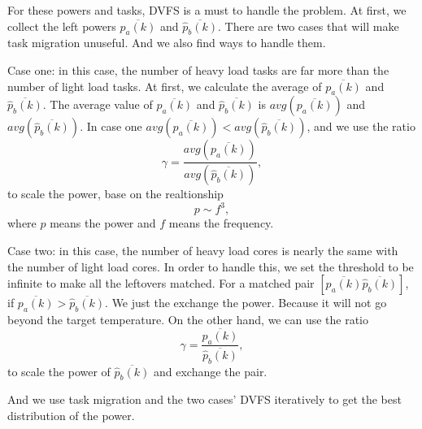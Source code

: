 For these powers and tasks, DVFS is a must to handle the problem.
At first, we collect the left powers $\overline{p_a(k)}$ and $\overline{\hat{p}_{b}(k)}$. There are two cases that will make task migration unuseful. And we also find ways to handle them.


Case one:
 in this case, the number of heavy load tasks are far more than the number of light load tasks. At first, we calculate the average of  $\overline{p_a(k)}$ and $\overline{\hat{p}_{b}(k)}$. The average value of $\overline{p_a(k)}$ and $\overline{\hat{p}_b(k)}$ is $avg(\overline{p_a(k)})$ and $avg(\overline{\hat{p}_b(k)})$.  In case one $avg(\overline{p_a(k)})<avg(\overline{\hat{p}_{b}(k)})$, and we use the ratio
\begin{equation}\label{r_dvfs}
\gamma=\frac{avg(\overline{p_a(k)})}{ avg(\overline{\hat{p}_{b}(k)})}, 
\end{equation}
to scale the power, base on the realtionship
\begin{equation}\label{r_dvfs}
p\sim f^3,
\end{equation}
where $p$ means the power and $f$ means the frequency.


Case two:
in this case, the number of heavy load cores is nearly the same with the number of light load cores. In order to handle this, we set the threshold to be infinite to make all the leftovers matched. For a matched pair $[\overline{p_a(k)} \overline{\hat{p}_{b}(k)}]$, if $\overline{p_a(k)}>\overline{\hat{p}_{b}(k)}$. We just the exchange the power. Because it will not go beyond the target temperature. On the other hand, we can use the ratio
\begin{equation}\label{r_dvfs}
\gamma=\frac{\overline{p_a(k)}}{\overline{\hat{p}_{b}(k)}}, 
\end{equation}
to scale the power of $\overline{\hat{p}_{b}(k)}$ and exchange the pair.


And we use task migration and the two cases' DVFS iteratively to get the best distribution of the power.
